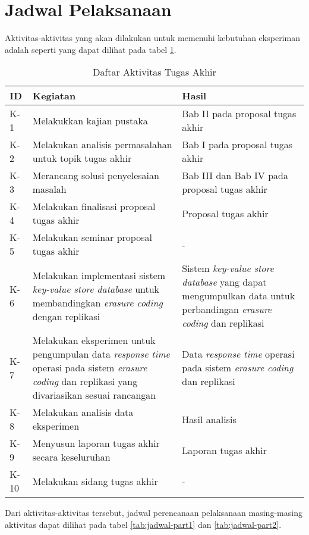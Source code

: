 \section{Jadwal Pelaksanaan}
\label{sec:jadwal-pelaksanaan}
Aktivitas-aktivitas yang akan dilakukan untuk memenuhi kebutuhan eksperiman adalah seperti yang dapat dilihat pada tabel \ref{tab:rincian-aktivitas}.

\begin{table}[ht]
\centering
\caption{Daftar Aktivitas Tugas Akhir}
\begin{tabular}{|p{1cm}|p{6cm}|p{6cm}|}
\hline
ID & Kegiatan & Hasil \\ \hline
K-1  & Melakukkan kajian pustaka & Bab II pada proposal tugas akhir \\ \hline
K-2  & Melakukan analisis permasalahan untuk topik tugas akhir & Bab I pada proposal tugas akhir \\ \hline
K-3  & Merancang solusi penyelesaian masalah & Bab III dan Bab IV pada proposal tugas akhir \\ \hline
K-4  & Melakukan finalisasi proposal tugas akhir & Proposal tugas akhir \\ \hline
K-5  & Melakukan seminar proposal tugas akhir & - \\ \hline
K-6  & Melakukan implementasi sistem \textit{key-value store database} untuk membandingkan \textit{erasure coding} dengan replikasi \textit{} & Sistem \textit{key-value store database} yang dapat mengumpulkan data untuk perbandingan \textit{erasure coding} dan replikasi \\ \hline
K-7  & Melakukan eksperimen untuk pengumpulan data \textit{response time} operasi pada sistem \textit{erasure coding} dan replikasi yang divariasikan sesuai rancangan & Data \textit{response time} operasi pada sistem \textit{erasure coding} dan replikasi \\ \hline
K-8  & Melakukan analisis data eksperimen & Hasil analisis \\ \hline
K-9  & Menyusun laporan tugas akhir secara keseluruhan & Laporan tugas akhir \\ \hline
K-10  & Melakukan sidang tugas akhir & - \\ \hline
\end{tabular}
\label{tab:rincian-aktivitas}
\end{table}

Dari aktivitas-aktivitas tersebut, jadwal perencanaan pelaksanaan masing-masing aktivitas dapat dilihat pada tabel \ref{tab:jadwal-part1} dan \ref{tab:jadwal-part2}.

